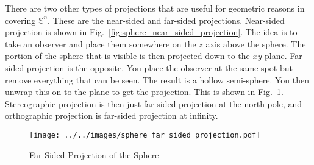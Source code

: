 \documentclass{article}
\theoremstyle{plain}
\theoremstyle{normal}
\begin{document}
        There are two other types of projections that are useful for geometric
        reasons in covering $\mathbb{S}^{n}$. These are the near-sided and
        far-sided projections. Near-sided projection is shown in
        Fig.~\ref{fig:sphere_near_sided_projection}. The idea is to take an
        observer and place them somewhere on the $z$ axis above the sphere.
        The portion of the sphere that is visible is then projected down to the
        $xy$ plane. Far-sided projection is the opposite. You place the
        observer at the same spot but remove everything that can be seen.
        The result is a hollow semi-sphere. You then unwrap this on to the
        plane to get the projection. This is shown in
        Fig.~\ref{fig:sphere_far_sided_projection}. Stereographic projection
        is then just far-sided projection at the north pole, and orthographic
        projection is far-sided projection at infinity.
        \begin{figure}
            \centering
            \texttt{[image: ../../images/sphere\_far\_sided\_projection.pdf]}
            \caption{Far-Sided Projection of the Sphere}
            \label{fig:sphere_far_sided_projection}
        \end{figure}
\end{document}
